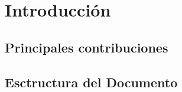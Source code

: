 \chapter{Introducci\'on}


\section{Principales contribuciones}

\section{Esctructura del Documento}